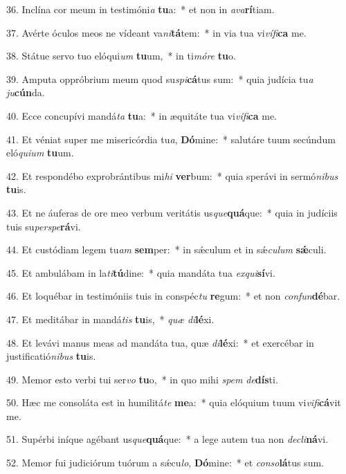 36. Inclína cor meum in testimóni\textit{a} \textbf{tu}a:~*  et non in \textit{a}\textit{va}\textbf{rí}tiam.\

37. Avérte óculos meos ne vídeant va\textit{ni}\textbf{tá}tem:~*  in via tua vi\textit{ví}\textit{fi}\textbf{ca} me.\

38. Státue servo tuo elóqui\textit{um} \textbf{tu}um,~*  in ti\textit{mó}\textit{re} \textbf{tu}o.\

39. Amputa oppróbrium meum quod su\textit{spi}\textbf{cá}tus sum:~*  quia judícia tu\textit{a} \textit{ju}\textbf{cún}da.\

40. Ecce concupívi mandá\textit{ta} \textbf{tu}a:~*  in æquitáte tua vi\textit{ví}\textit{fi}\textbf{ca} me.\

41. Et véniat super me misericórdia tu\textit{a}, \textbf{Dó}mine:~*  salutáre tuum secúndum eló\textit{qui}\textit{um} \textbf{tu}um.\

42. Et respondébo exprobrántibus mi\textit{hi} \textbf{ver}bum:~*  quia sperávi in sermó\textit{ni}\textit{bus} \textbf{tu}is.\

43. Et ne áuferas de ore meo verbum veritátis us\textit{que}\textbf{quá}que:~*  quia in judíciis tuis su\textit{per}\textit{spe}\textbf{rá}vi.\

44. Et custódiam legem tu\textit{am} \textbf{sem}per:~*  in sǽculum et in sǽ\textit{cu}\textit{lum} \textbf{sǽ}culi.\

45. Et ambulábam in la\textit{ti}\textbf{tú}dine:~*  quia mandáta tua \textit{ex}\textit{qui}\textbf{sí}vi.\

46. Et loquébar in testimóniis tuis in conspéc\textit{tu} \textbf{re}gum:~*  et non \textit{con}\textit{fun}\textbf{dé}bar.\

47. Et meditábar in mandá\textit{tis} \textbf{tu}is,~*  \textit{quæ} \textit{di}\textbf{lé}xi.\

48. Et levávi manus meas ad mandáta tua, quæ \textit{di}\textbf{lé}xi:~*  et exercébar in justificatió\textit{ni}\textit{bus} \textbf{tu}is.\

49. Memor esto verbi tui ser\textit{vo} \textbf{tu}o,~*  in quo mihi \textit{spem} \textit{de}\textbf{dís}ti.\

50. Hæc me consoláta est in humilitá\textit{te} \textbf{me}a:~*  quia elóquium tuum vi\textit{vi}\textit{fi}\textbf{cá}vit me.\

51. Supérbi iníque agébant us\textit{que}\textbf{quá}que:~*  a lege autem tua non \textit{de}\textit{cli}\textbf{ná}vi.\

52. Memor fui judiciórum tuórum a sǽcu\textit{lo}, \textbf{Dó}mine:~*  et \textit{con}\textit{so}\textbf{lá}tus sum.\

